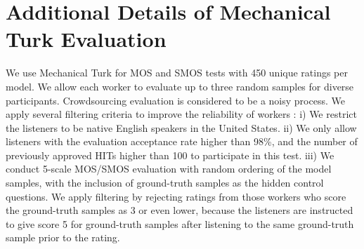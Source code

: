 \documentclass{article} \usepackage{iclr2023_conference,times}
\theoremstyle{plain}
\theoremstyle{definition}
\theoremstyle{remark}
\begin{document}
\section{Additional Details of Mechanical Turk Evaluation}
\label{appendix:AMT}
We use Mechanical Turk for MOS and SMOS tests with 450 unique ratings per model. We allow each worker to evaluate up to three random samples for diverse participants.
 Crowdsourcing evaluation is considered to be a noisy process. 
 We apply several filtering criteria to improve the reliability of workers : i) We restrict the listeners to be native English speakers in the United States. ii) We only allow listeners with the evaluation acceptance rate higher than 98\%, and the number of previously approved HITs higher than 100 to participate in this test. iii) We conduct 5-scale MOS/SMOS evaluation with random ordering of the model samples, with the inclusion of ground-truth samples as the hidden control questions. We apply filtering by rejecting ratings from those workers who score the ground-truth samples as 3 or even lower, because the listeners are instructed to give score 5 for ground-truth samples after listening to the same ground-truth sample prior to the rating.
\end{document}
